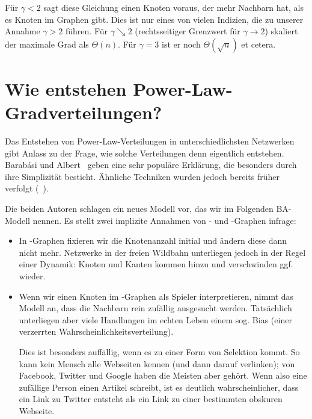 Für $\gamma  < 2$ sagt diese Gleichung einen Knoten voraus, der mehr Nachbarn hat, als es Knoten im Graphen gibt.
Dies ist nur eines von vielen Indizien, die zu unserer Annahme $\gamma > 2$ führen.
Für $\gamma \searrow 2$ (\dh rechtsseitiger Grenzwert für $\gamma \to 2$) skaliert der maximale Grad als $\Theta(n)$.
Für $\gamma = 3$ ist er noch $\Theta(\sqrt{n})$ et cetera.

\section{Wie entstehen Power-Law-Gradverteilungen?}
Das Entstehen von Power-Law-Verteilungen in unterschiedlichsten Netzwerken gibt Anlass zu der Frage, wie solche Verteilungen denn eigentlich entstehen.
Barab{\'{a}}si und Albert~\cite{barabasi1999emergence} geben eine sehr populäre Erklärung, die besonders durch ihre Simplizität besticht.
Ähnliche Techniken wurden jedoch bereits früher verfolgt (\zB~\cite{10.2307/1716232}).

Die beiden Autoren schlagen ein neues Modell vor, das wir im Folgenden BA-Modell nennen.
Es stellt zwei implizite Annahmen von \Gnp- und \Gnm-Graphen infrage:
\begin{itemize}
    \item
          In \Gnp-Graphen fixieren wir die Knotenanzahl initial und ändern diese dann nicht mehr.
          Netzwerke in der freien Wildbahn unterliegen jedoch in der Regel einer Dynamik:
          Knoten und Kanten kommen hinzu und verschwinden ggf. wieder.

    \item
          Wenn wir einen Knoten im \Gnp-Graphen als Spieler interpretieren, nimmt das Modell an, dass die Nachbarn rein zufällig ausgesucht werden.
          Tatsächlich unterliegen aber viele Handlungen im echten Leben einem sog. Bias (\dh einer verzerrten Wahrscheinlichkeitsverteilung).

          Dies ist besonders auffällig, wenn es zu einer Form von Selektion kommt.
          So kann kein Mensch alle Webseiten kennen (und dann darauf verlinken); von Facebook, Twitter und Google haben die Meisten aber gehört.
          Wenn also eine zufällige Person einen Artikel schreibt, ist es deutlich wahrscheinlicher, dass ein Link zu Twitter entsteht als ein Link zu einer bestimmten obskuren Webseite.
\end{itemize}

